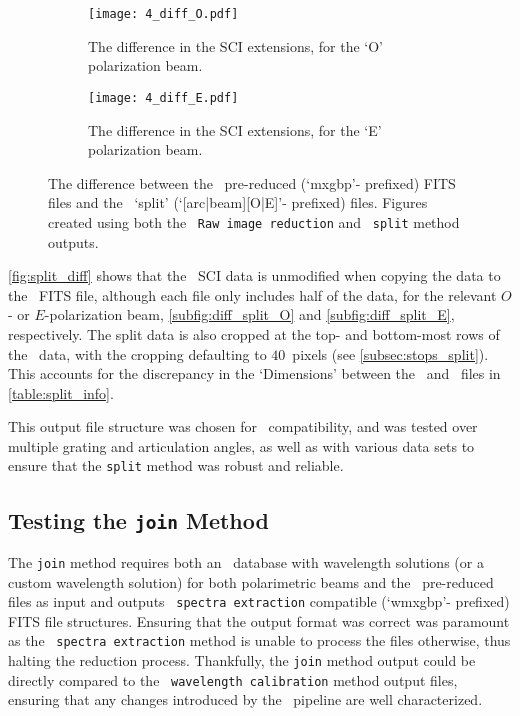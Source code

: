 \begin{figure}
    \centering
    \begin{subfigure}[b]{\textwidth}
        \centering
        \texttt{[image: 4\_diff\_O.pdf]}
        \caption{The difference in the \gls{SCI} extensions, for the `O' polarization beam.}
        \label{subfig:diff_split_O}
    \end{subfigure}
    \hfill
    \begin{subfigure}[b]{\textwidth}
        \centering
        \texttt{[image: 4\_diff\_E.pdf]}
        \caption{The difference in the \gls{SCI} extensions, for the `E' polarization beam.}
        \label{subfig:diff_split_E}
    \end{subfigure}
    \caption{The difference between the \polsalt\ pre-reduced (`mxgbp'- prefixed) \gls{FITS} files and the \stops\ `split' (`[arc|beam][O|E]'- prefixed) files. Figures created using both the \polsalt\ \texttt{Raw image reduction} and \stops\ \texttt{split} method outputs.}
    \label{fig:split_diff}
\end{figure}

\autoref{fig:split_diff} shows that the \polsalt\ \gls{SCI} data is unmodified when copying the data to the \stops\ \gls{FITS} file, although each file only includes half of the data, for the relevant $O$- or $E$-polarization beam, \autoref{subfig:diff_split_O} and \autoref{subfig:diff_split_E}, respectively.
The split data is also cropped at the top- and bottom-most rows of the \polsalt\ data, with the cropping defaulting to $40$~pixels (see \autoref{subsec:stops_split}).
This accounts for the discrepancy in the `Dimensions' between the \polsalt\ and \stops\ files in \autoref{table:split_info}.

This output file structure was chosen for \iraf\ compatibility, and was tested over multiple grating and articulation angles, as well as with various data sets to ensure that the \texttt{split} method was robust and reliable.

\subsection{Testing the \texttt{join} Method} \label{subsec:test_join}

The \texttt{join} method requires both an \iraf\ database with wavelength solutions (or a custom wavelength solution) for both polarimetric beams and the \polsalt\ pre-reduced files as input and outputs \polsalt\ \texttt{spectra extraction} compatible (`wmxgbp'- prefixed) \gls{FITS} file structures.
Ensuring that the output format was correct was paramount as the \polsalt\ \texttt{spectra extraction} method is unable to process the files otherwise, thus halting the reduction process.
Thankfully, the \texttt{join} method output could be directly compared to the \polsalt\ \texttt{wavelength calibration} method output files, ensuring that any changes introduced by the \stops\ pipeline are well characterized.

